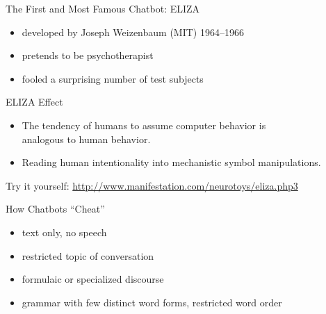 \documentclass[xcolor={usenames,svgnames,x11names,dvipsnames,table}]{beamer}
\begin{document}
\begin{frame}{The First and Most Famous Chatbot: ELIZA}
    \begin{itemize}
        \item developed by Joseph Weizenbaum (MIT) 1964--1966
        \item pretends to be psychotherapist
        \item fooled a surprising number of test subjects
    \end{itemize}

    \begin{block}{ELIZA Effect}
        \begin{itemize}
            \item The tendency of humans to assume computer behavior is\\ analogous to human behavior.
            \item Reading human intentionality into mechanistic symbol manipulations.
        \end{itemize}
    \end{block}

    \pause
    \begin{center}
        Try it yourself: \url{http://www.manifestation.com/neurotoys/eliza.php3}
    \end{center}
\end{frame}


\begin{frame}{How Chatbots ``Cheat''}
    \begin{itemize}
        \item text only, no speech
        \item restricted topic of conversation\\
        \item formulaic or specialized discourse\\
        \item grammar with few distinct word forms, restricted word order\\
    \end{itemize}
\end{frame}
\end{document}
